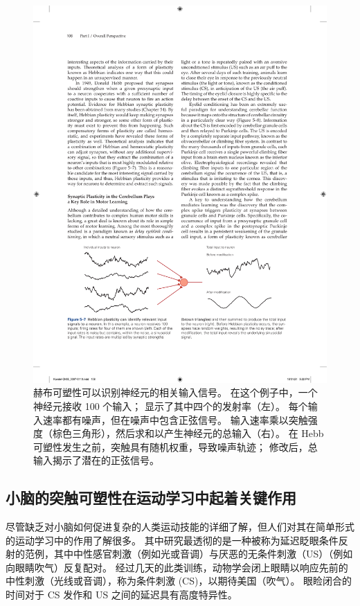 \begin{figure}[htbp]
	\centering
	\includegraphics[width=1.0\linewidth]{chap05/fig_5_7}
	\caption{赫布可塑性可以识别神经元的相关输入信号。
		在这个例子中，一个神经元接收 100 个输入； 显示了其中四个的发射率（左）。 
		每个输入速率都有噪声，但在噪声中包含正弦信号。 
		输入速率乘以突触强度（棕色三角形），然后求和以产生神经元的总输入（右）。 
		在 Hebb 可塑性发生之前，突触具有随机权重，导致噪声轨迹； 修改后，总输入揭示了潜在的正弦信号。}
	\label{fig:5_7}
\end{figure}


\subsection{小脑的突触可塑性在运动学习中起着关键作用}

尽管缺乏对小脑如何促进复杂的人类运动技能的详细了解，但人们对其在简单形式的运动学习中的作用了解很多。
其中研究最透彻的是一种被称为延迟眨眼条件反射的范例，其中中性感官刺激（例如光或音调）与厌恶的无条件刺激（US）（例如向眼睛吹气）反复配对。
经过几天的此类训练，动物学会闭上眼睛以响应先前的中性刺激（光线或音调），称为条件刺激 (CS)，以期待美国（吹气）。
眼睑闭合的时间对于 CS 发作和 US 之间的延迟具有高度特异性。


